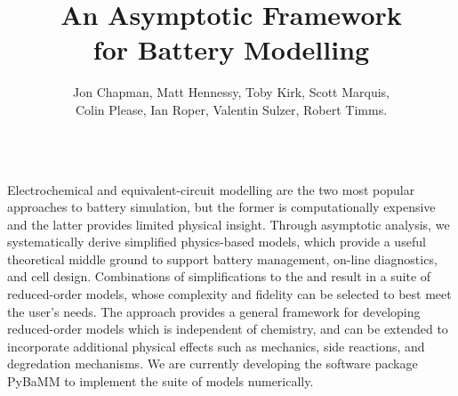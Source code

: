 \documentclass{beamer}
\author[]{
  	Jon Chapman,
  	Matt Hennessy,
  	Toby Kirk,
	Scott Marquis,\\
  	Colin Please,
  	Ian Roper,
	Valentin Sulzer,
	Robert Timms.
}
\title{An Asymptotic Framework\\ for Battery Modelling}
\institute{Your Institution}
\begin{document}
\begin{frame}[fragile]
\centering

\vspace{-2em}
\begin{columns}
  \begin{column}{0.9\linewidth}
	\begin{topblock}{}
	  \small

Electrochemical and equivalent-circuit modelling are the two most popular approaches to battery simulation, but the former is computationally expensive and the latter provides limited physical insight. Through asymptotic analysis, we systematically derive simplified physics-based models, which provide a useful theoretical middle ground to support battery management, on-line diagnostics, and cell design. Combinations of simplifications to the {} and {} result in a suite of reduced-order models, whose complexity and fidelity can be selected to best meet the user's needs. The approach provides a general framework for developing reduced-order models which is independent of chemistry, and can be extended to incorporate additional physical effects such as mechanics, side reactions, and degredation mechanisms. We are currently developing the software package PyBaMM to implement the suite of models numerically.


\end{topblock}
  \end{column}
\end{columns}




\end{frame}
\end{document}

